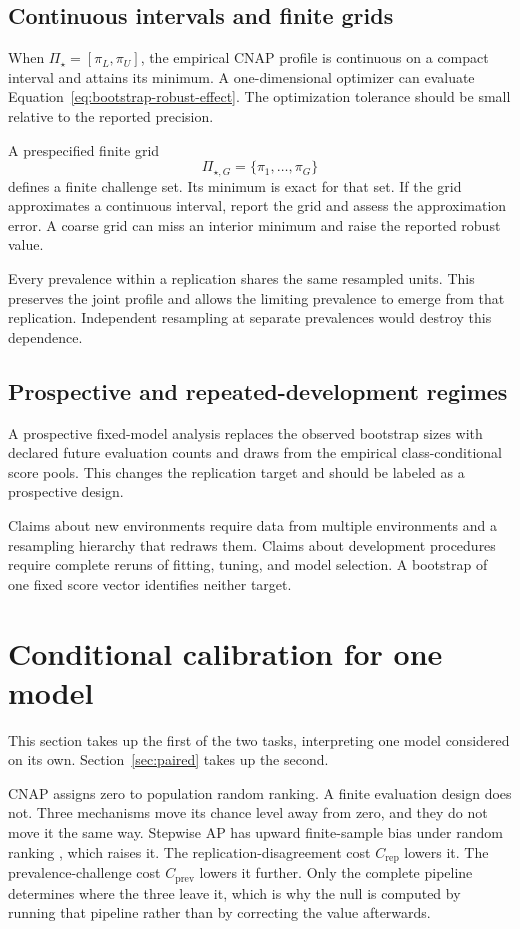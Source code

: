 \documentclass[11pt]{article}
\newcommand{\PSet}{\Pi_\star}
\theoremstyle{remark}
\begin{document}
\subsection{Continuous intervals and finite grids}

When $\PSet=[\pi_L,\pi_U]$, the empirical CNAP profile is continuous on a compact interval and attains its minimum. A one-dimensional optimizer can evaluate Equation~\eqref{eq:bootstrap-robust-effect}. The optimization tolerance should be small relative to the reported precision.

A prespecified finite grid
\[
\Pi_{\star,G}=\{\pi_1,\ldots,\pi_G\}
\]
defines a finite challenge set. Its minimum is exact for that set. If the grid approximates a continuous interval, report the grid and assess the approximation error. A coarse grid can miss an interior minimum and raise the reported robust value.

Every prevalence within a replication shares the same resampled units. This preserves the joint profile and allows the limiting prevalence to emerge from that replication. Independent resampling at separate prevalences would destroy this dependence.

\subsection{Prospective and repeated-development regimes}

A prospective fixed-model analysis replaces the observed bootstrap sizes with declared future evaluation counts and draws from the empirical class-conditional score pools. This changes the replication target and should be labeled as a prospective design.

Claims about new environments require data from multiple environments and a resampling hierarchy that redraws them. Claims about development procedures require complete reruns of fitting, tuning, and model selection. A bootstrap of one fixed score vector identifies neither target.

\section{Conditional calibration for one model}
\label{sec:calibration}

This section takes up the first of the two tasks, interpreting one model considered on its own. Section~\ref{sec:paired} takes up the second.

CNAP assigns zero to population random ranking. A finite evaluation design does not. Three mechanisms move its chance level away from zero, and they do not move it the same way. Stepwise AP has upward finite-sample bias under random ranking \cite{bestgen2015random}, which raises it. The replication-disagreement cost $C_{\mathrm{rep}}$ lowers it. The prevalence-challenge cost $C_{\mathrm{prev}}$ lowers it further. Only the complete pipeline determines where the three leave it, which is why the null is computed by running that pipeline rather than by correcting the value afterwards.
\end{document}
